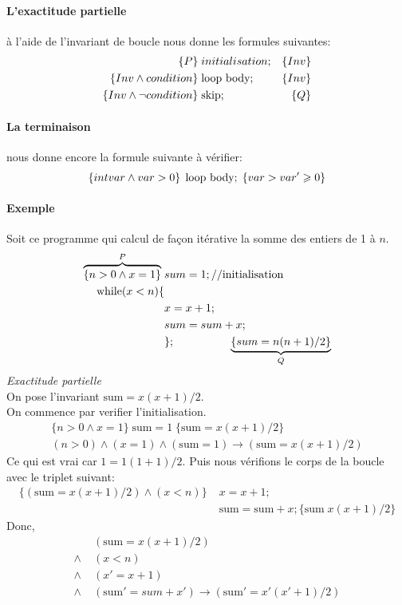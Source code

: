 \documentclass[12pt]{article}
\begin{document}
\paragraph*{L'exactitude partielle} à l'aide de l'invariant de boucle
nous donne les formules suivantes:
\begin{align*}
    \left\{P\right\}\; &initialisation; &\left\{Inv\right\}\\
    \left\{Inv \wedge condition\right\}\; &\textnormal{loop body}; &\left\{Inv\right\}\\
    \left\{Inv \wedge \lnot condition\right\}\; &\textnormal{skip}; &\left\{Q\right\}
\end{align*}

\paragraph*{La terminaison} nous donne encore la formule suivante à 
vérifier:
\begin{equation*}
    \left\{int var \wedge var > 0\right\}\; \textnormal{loop body};\; \left\{var > var'\geqslant 0\right\}
\end{equation*}

\paragraph*{Exemple} 
Soit ce programme qui calcul de façon itérative la somme des entiers de 1 à $n$.
\begin{align*}
    \overbrace{\left\{n>0 \wedge x = 1\right\}}^{P}\; &sum = 1; \textnormal{//initialisation}\\
    \textnormal{while}(x<n) \{\\
                            &x = x + 1;\\
                            &sum = sum + x;\\
                            &\}; \quad \qquad \qquad \underbrace{\left\{sum = n(n+1)/2\right\}}_{Q}
\end{align*}
\emph{Exactitude partielle}\\
On pose l'invariant \(\text{sum} = x(x+1)/2\).\\
On commence par verifier l'initialisation.
\begin{align*}
    \{n>0 \wedge x = 1\}\; \text{sum} = 1 \;\{\text{sum} = x(x+1)/2\}\\
    (n>0) \wedge (x=1) \wedge (\text{sum} = 1) \rightarrow (\text{sum} = x(x+1)/2)
\end{align*}
Ce qui est vrai car \(1 = 1(1+1)/2\). Puis nous vérifions le corps de la
boucle avec le triplet suivant:
\begin{align*}
    \{(\text{sum} = x(x+1)/2) \wedge (x<n)\}\; &x = x + 1;\\
    &\text{sum} = \text{sum} + x; \{\text{sum}\; x(x+1)/2\}
\end{align*}
Donc,
\begin{align*}
    &(\text{sum} = x(x+1)/2)\\
    \wedge\; &(x<n)\\
    \wedge\; &(x' = x + 1)\\
    \wedge\; &(\text{sum}' = sum + x') \rightarrow (\text{sum}' = x'(x'+1)/2)
\end{align*}
\end{document}
